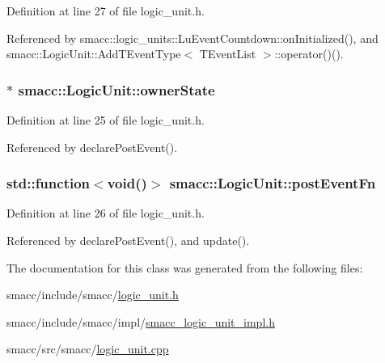 Definition at line 27 of file logic\+\_\+unit.\+h.



Referenced by smacc\+::logic\+\_\+units\+::\+Lu\+Event\+Countdown\+::on\+Initialized(), and smacc\+::\+Logic\+Unit\+::\+Add\+T\+Event\+Type$<$ T\+Event\+List $>$\+::operator()().

\subsubsection[{\texorpdfstring{owner\+State}{ownerState}}]{$\ast$ smacc\+::\+Logic\+Unit\+::owner\+State}\hypertarget{classsmacc_1_1LogicUnit_a8863d227f46868876632b07b500f27d6}{}\label{classsmacc_1_1LogicUnit_a8863d227f46868876632b07b500f27d6}


Definition at line 25 of file logic\+\_\+unit.\+h.



Referenced by declare\+Post\+Event().

\subsubsection[{\texorpdfstring{post\+Event\+Fn}{postEventFn}}]{\setlength{\rightskip}{0pt plus 5cm}std\+::function$<$void()$>$ smacc\+::\+Logic\+Unit\+::post\+Event\+Fn}\hypertarget{classsmacc_1_1LogicUnit_ac75aaeeea0e8d3667763a332ecfd65f7}{}\label{classsmacc_1_1LogicUnit_ac75aaeeea0e8d3667763a332ecfd65f7}


Definition at line 26 of file logic\+\_\+unit.\+h.



Referenced by declare\+Post\+Event(), and update().



The documentation for this class was generated from the following files\+:\begin{DoxyCompactItemize}
\item 
smacc/include/smacc/\hyperlink{logic__unit_8h}{logic\+\_\+unit.\+h}\item 
smacc/include/smacc/impl/\hyperlink{smacc__logic__unit__impl_8h}{smacc\+\_\+logic\+\_\+unit\+\_\+impl.\+h}\item 
smacc/src/smacc/\hyperlink{logic__unit_8cpp}{logic\+\_\+unit.\+cpp}\end{DoxyCompactItemize}
